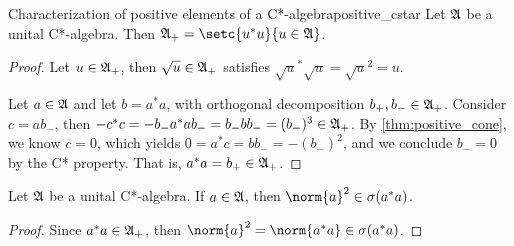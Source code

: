 \begin{theorem}{Characterization of positive elements of a C*-algebra}{positive_cstar}
    Let \(\mathfrak{A}\) be a unital C*-algebra. Then \(\algebra{A}_+ = \setc{u^*u}{u \in \algebra{A}}\).
\end{theorem}
\begin{proof}
    Let \(u \in \mathfrak{A}_+\), then \(\sqrt{u} \in\mathfrak{A}_+\) satisfies \(\sqrt{u}^* \sqrt{u} = \sqrt{u}^2 = u\).

    Let \(a \in \mathfrak{A}\) and let \(b = a^*a\), with orthogonal decomposition \(b_+, b_- \in \mathfrak{A}_+\). Consider \(c = ab_-\), then \(- c^*c = - b_- a^* a b_- = b_-bb_- = (b_-)^3 \in \mathfrak{A}_+\). By \cref{thm:positive_cone}, we know \(c = 0\), which yields \(0 = a^*c = b b_- = -(b_-)^2\), and we conclude \(b_- = 0\) by the C* property. That is, \(a^*a = b_+ \in \mathfrak{A}_+\).
\end{proof}

\begin{corollary}
    Let \(\mathfrak{A}\) be a unital C*-algebra. If \(a \in \mathfrak{A}\), then \(\norm{a}^2 \in \sigma(a^*a)\).
\end{corollary}
\begin{proof}
    Since \(a^*a \in \mathfrak{A}_+\), then \(\norm{a}^2 = \norm{a^*a} \in \sigma(a^*a)\).
\end{proof}

